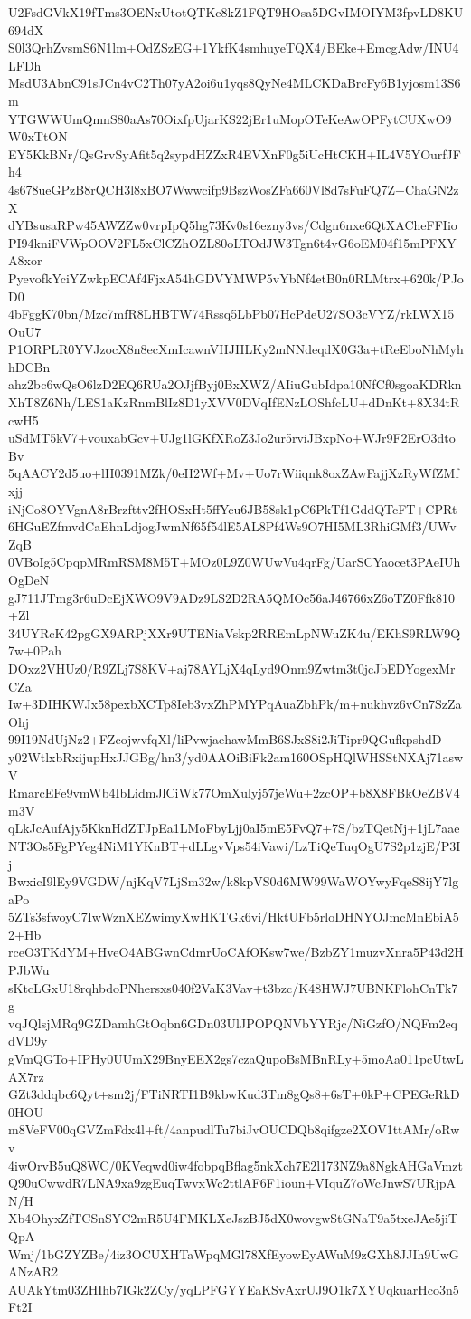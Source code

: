 U2FsdGVkX19fTms3OENxUtotQTKc8kZ1FQT9HOsa5DGvIMOIYM3fpvLD8KU694dX
S0l3QrhZvsmS6N1lm+OdZSzEG+1YkfK4smhuyeTQX4/BEke+EmcgAdw/INU4LFDh
MsdU3AbnC91sJCn4vC2Th07yA2oi6u1yqs8QyNe4MLCKDaBrcFy6B1yjosm13S6m
YTGWWUmQmnS80aAs70OixfpUjarKS22jEr1uMopOTeKeAwOPFytCUXwO9W0xTtON
EY5KkBNr/QsGrvSyAfit5q2sypdHZZxR4EVXnF0g5iUcHtCKH+IL4V5YOurfJFh4
4s678ueGPzB8rQCH3l8xBO7Wwwcifp9BszWosZFa660Vl8d7sFuFQ7Z+ChaGN2zX
dYBsusaRPw45AWZZw0vrpIpQ5hg73Kv0s16ezny3vs/Cdgn6nxe6QtXACheFFIio
PI94kniFVWpOOV2FL5xClCZhOZL80oLTOdJW3Tgn6t4vG6oEM04f15mPFXYA8xor
PyevofkYciYZwkpECAf4FjxA54hGDVYMWP5vYbNf4etB0n0RLMtrx+620k/PJoD0
4bFggK70bn/Mzc7mfR8LHBTW74Rssq5LbPb07HcPdeU27SO3cVYZ/rkLWX15OuU7
P1ORPLR0YVJzocX8n8ecXmIcawnVHJHLKy2mNNdeqdX0G3a+tReEboNhMyhhDCBn
ahz2bc6wQsO6lzD2EQ6RUa2OJjfByj0BxXWZ/AIiuGubIdpa10NfCf0sgoaKDRkn
XhT8Z6Nh/LES1aKzRnmBlIz8D1yXVV0DVqIfENzLOShfcLU+dDnKt+8X34tRcwH5
uSdMT5kV7+vouxabGcv+UJg1lGKfXRoZ3Jo2ur5rviJBxpNo+WJr9F2ErO3dtoBv
5qAACY2d5uo+lH0391MZk/0eH2Wf+Mv+Uo7rWiiqnk8oxZAwFajjXzRyWfZMfxjj
iNjCo8OYVgnA8rBrzfttv2fHOSxHt5ffYcu6JB58sk1pC6PkTf1GddQTcFT+CPRt
6HGuEZfmvdCaEhnLdjogJwmNf65f54lE5AL8Pf4Ws9O7HI5ML3RhiGMf3/UWvZqB
0VBoIg5CpqpMRmRSM8M5T+MOz0L9Z0WUwVu4qrFg/UarSCYaocet3PAeIUhOgDeN
gJ711JTmg3r6uDcEjXWO9V9ADz9LS2D2RA5QMOc56aJ46766xZ6oTZ0Ffk810+Zl
34UYRcK42pgGX9ARPjXXr9UTENiaVskp2RREmLpNWuZK4u/EKhS9RLW9Q7w+0Pah
DOxz2VHUz0/R9ZLj7S8KV+aj78AYLjX4qLyd9Onm9Zwtm3t0jcJbEDYogexMrCZa
Iw+3DIHKWJx58pexbXCTp8Ieb3vxZhPMYPqAuaZbhPk/m+nukhvz6vCn7SzZaOhj
99I19NdUjNz2+FZcojwvfqXl/liPvwjaehawMmB6SJxS8i2JiTipr9QGufkpshdD
y02WtlxbRxijupHxJJGBg/hn3/yd0AAOiBiFk2am160OSpHQlWHSStNXAj71aswV
RmarcEFe9vmWb4IbLidmJlCiWk77OmXulyj57jeWu+2zcOP+b8X8FBkOeZBV4m3V
qLkJcAufAjy5KknHdZTJpEa1LMoFbyLjj0aI5mE5FvQ7+7S/bzTQetNj+1jL7aae
NT3Os5FgPYeg4NiM1YKnBT+dLLgvVps54iVawi/LzTiQeTuqOgU7S2p1zjE/P3Ij
BwxicI9lEy9VGDW/njKqV7LjSm32w/k8kpVS0d6MW99WaWOYwyFqeS8ijY7lgaPo
5ZTs3sfwoyC7IwWznXEZwimyXwHKTGk6vi/HktUFb5rloDHNYOJmcMnEbiA52+Hb
rceO3TKdYM+HveO4ABGwnCdmrUoCAfOKsw7we/BzbZY1muzvXnra5P43d2HPJbWu
sKtcLGxU18rqhbdoPNhersxs040f2VaK3Vav+t3bzc/K48HWJ7UBNKFlohCnTk7g
vqJQlsjMRq9GZDamhGtOqbn6GDn03UlJPOPQNVbYYRjc/NiGzfO/NQFm2eqdVD9y
gVmQGTo+IPHy0UUmX29BnyEEX2gs7czaQupoBsMBnRLy+5moAa011pcUtwLAX7rz
GZt3ddqbc6Qyt+sm2j/FTiNRTI1B9kbwKud3Tm8gQs8+6sT+0kP+CPEGeRkD0HOU
m8VeFV00qGVZmFdx4l+ft/4anpudlTu7biJvOUCDQb8qifgze2XOV1ttAMr/oRwv
4iwOrvB5uQ8WC/0KVeqwd0iw4fobpqBflag5nkXch7E2l173NZ9a8NgkAHGaVmzt
Q90uCwwdR7LNA9xa9zgEuqTwvxWc2ttlAF6F1ioun+VIquZ7oWcJnwS7URjpAN/H
Xb4OhyxZfTCSnSYC2mR5U4FMKLXeJszBJ5dX0wovgwStGNaT9a5txeJAe5jiTQpA
Wmj/1bGZYZBe/4iz3OCUXHTaWpqMGl78XfEyowEyAWuM9zGXh8JJIh9UwGANzAR2
AUAkYtm03ZHIhb7IGk2ZCy/yqLPFGYYEaKSvAxrUJ9O1k7XYUqkuarHco3n5Ft2I
